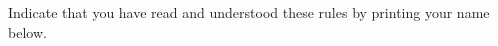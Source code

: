 \documentclass[exam, 12pt]{wvwcdocs}
\begin{document}
\begin{coverpages}
\begin{minipage}[t]{.5\linewidth}
        Indicate that you have read and understood these rules by printing your name below.

        \vspace{1cm}

    \end{minipage}
    \hspace{.5cm}
    \begin{minipage}[t]{.4\linewidth}
        \vspace{0pt}
        \combinedgradetable[v][pages]  %

    \end{minipage}

    \newpage %
    $\,$
\end{coverpages}
\end{document}

